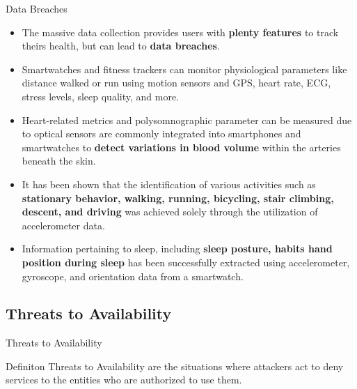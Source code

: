 \documentclass[ucs,9pt,usenames,dvipsnames]{beamer}
\begin{document}
\begin{frame}{Data Breaches}
	\begin{itemize}
		
		\item The massive data collection provides users with \textbf{plenty features} to track theirs health, but can lead to \textbf{data breaches}.
		
		\item Smartwatches and fitness trackers can monitor physiological parameters like distance walked or run using motion sensors and GPS, heart rate, ECG, stress levels, sleep quality, and more.
		
		\item Heart-related metrics and polysomnographic parameter can be measured due to optical sensors are commonly integrated into smartphones and smartwatches to \textbf{detect variations in blood volume} within the arteries beneath the skin.
		
		\item It has been shown that the identification of various activities such as \textbf{stationary behavior, walking, running, bicycling, stair climbing, descent, and driving} was achieved solely through the utilization of accelerometer data. 	
			
		\item Information pertaining to sleep, including \textbf{sleep posture, habits hand position during sleep} has been successfully extracted using accelerometer, gyroscope, and orientation data from a smartwatch. 	
	\end{itemize}
\end{frame}
\fi

\subsection{Threats to Availability}

\begin{frame}{Threats to Availability}
	
	\begin{alertblock}{Definiton}
		Threats to Availability are the situations where attackers act  to deny services to the entities who are authorized to use them.
	\end{alertblock}
\end{frame}
\end{document}
